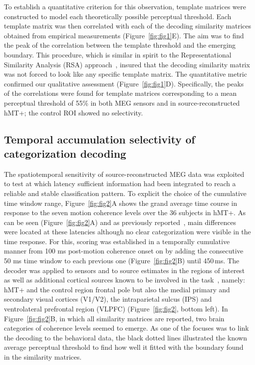 To establish a quantitative criterion for this observation, template matrices were constructed to model each theoretically possible perceptual threshold. Each template matrix was then correlated with each of the decoding similarity matrices obtained from empirical measurements (Figure~\ref{fig:fig1}E). The aim was to find the peak of the correlation between the template threshold and the emerging boundary. This procedure, which is similar in spirit to the Representational Similarity Analysis (RSA) approach~\cite{Kriegeskorte-etal:08,9cichy2014resolving}, insured that the decoding similarity matrix was not forced to look like any specific template matrix. The quantitative metric confirmed our qualitative assessment (Figure~\ref{fig:fig1}D). Specifically, the peaks of the correlations were found for template matrices corresponding to a mean perceptual threshold of 55\% in both MEG sensors and in source-reconstructed hMT+; the control ROI showed no selectivity.

\subsection*{Temporal accumulation selectivity of categorization decoding}
The spatiotemporal sensitivity of source-reconstructed MEG data was exploited to test at which latency sufficient information had been integrated to reach a reliable and stable classification pattern. To explicit the choice of the cumulative time window range, Figure~\ref{fig:fig2}A shows the grand average time course in response to the seven motion coherence levels over the 36 subjects in hMT+. As can be seen (Figure~\ref{fig:fig2}A) and as previously reported~\cite{23zilber2014supramodal}, main differences were located at these latencies although no clear categorization were visible in the time response. For this, scoring was established in a temporally cumulative manner from 100 ms post-motion coherence onset on by adding the consecutive 50 ms time window to each previous one (Figure~\ref{fig:fig2}B) until 450\,ms. The decoder was applied to sensors and to source estimates in the regions of interest as well as additional cortical sources known to be involved in the task~\cite{23zilber2014supramodal}, namely: hMT+ and the control region frontal pole but also the medial primary and secondary visual cortices (V1/V2), the intraparietal sulcus (IPS) and ventrolateral prefrontal region (VLPFC) (Figure~\ref{fig:fig2}, bottom left). In Figure~\ref{fig:fig2}B, in which all similarity matrices are reported, two brain categories of coherence levels seemed to emerge. As one of the focuses was to link the decoding to the behavioral data, the black dotted lines illustrated the known average perceptual threshold  to find how well it fitted with the boundary found in the similarity matrices.

